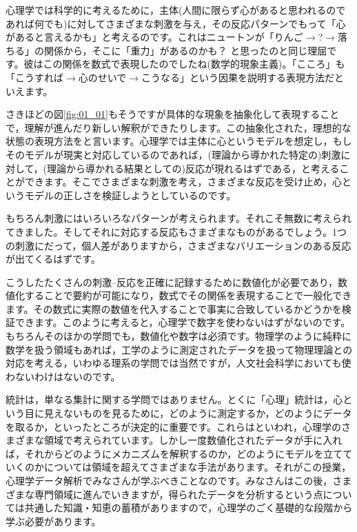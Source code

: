 \documentclass{ltjsbook}
\begin{document}
心理学では科学的に考えるために，主体(人間に限らず心があると思われるのであれば何でも)に対してさまざまな刺激を与え，その反応パターンでもって「心があると言えるかも」と考えるのです。これはニュートンが「りんご$\to$?$\to$落ちる」の関係から，そこに「重力」があるのかも？ と思ったのと同じ理屈です。彼はこの関係を数式で表現したのでしたね(数学的現象主義)。「こころ」も「こうすれば$\to$心のせいで$\to$こうなる」という因果を説明する表現方法だといえます。

さきほどの図\ref{fig:01_01}もそうですが具体的な現象を抽象化して表現することで，理解が進んだり新しい解釈ができたりします。この抽象化された，理想的な状態の表現方法をと言います。心理学では主体に心というモデルを想定し，もしそのモデルが現実と対応しているのであれば，(理論から導かれた特定の)刺激に対して，(理論から導かれる結果としての)反応が現れるはずである，と考えることができます。そこでさまざまな刺激を考え，さまざまな反応を受け止め，心というモデルの正しさを検証しようとしているのです。

もちろん刺激にはいろいろなパターンが考えられます。それこそ無数に考えられてきました。そしてそれに対応する反応もさまざまなものがあるでしょう。1つの刺激にだって，個人差がありますから，さまざまなバリエーションのある反応が出てくるはずです。

こうしたたくさんの刺激--反応を正確に記録するために数値化が必要であり，数値化することで要約が可能になり，数式でその関係を表現することで一般化できます。その数式に実際の数値を代入することで事実に合致しているかどうかを検証できます。このように考えると，心理学で数字を使わないはずがないのです。もちろんそのほかの学問でも，数値化や数字は必須です。物理学のように純粋に数学を扱う領域もあれば，工学のように測定されたデータを扱って物理理論との対応を考える，いわゆる理系の学問では当然ですが，人文社会科学においても使わないわけはないのです。

統計は，単なる集計に関する学問ではありません。とくに「心理」統計は，心という目に見えないものを見るために，どのように測定するか，どのようにデータを取るか，といったところが決定的に重要です。これらはといわれ，心理学のさまざまな領域で考えられています。しかし一度数値化されたデータが手に入れば，それからどのようにメカニズムを解釈するのか，どのようにモデルを立てていくのかについては領域を超えてさまざまな手法があります。それがこの授業，心理学データ解析でみなさんが学ぶべきことなのです。みなさんはこの後，さまざまな専門領域に進んでいきますが，得られたデータを分析するという点については共通した知識・知恵の蓄積がありますので，心理学のごく基礎的な段階から学ぶ必要があります。
\end{document}
